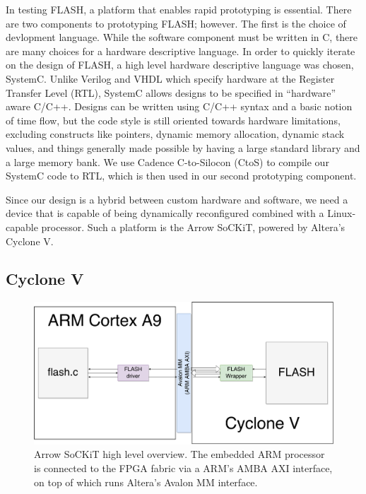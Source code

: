 \documentclass{sig-alternate-10pt}
\begin{document}
In testing FLASH, a platform that enables rapid prototyping is essential.
There are two components to prototyping FLASH; however. The first is the
choice of devlopment language. While the software component must be written
in C, there are many choices for a hardware descriptive language. In order
to quickly iterate on the design of FLASH, a high level hardware descriptive
language was chosen, SystemC. Unlike Verilog and VHDL which specify hardware
at the Register Transfer Level (RTL), SystemC allows designs to
be specified in ``hardware'' aware C/C++. Designs can be written using C/C++
syntax and a basic notion of time flow, but the code style is still oriented
towards hardware limitations, excluding constructs like pointers, dynamic
memory allocation, dynamic stack values, and things generally made possible
by having a large standard library and a large memory bank. We use Cadence
C-to-Silocon (CtoS) to compile our SystemC code to RTL, which is then used
in our second prototyping component.

Since our design is a hybrid between custom hardware and software, we need a device that is capable of being dynamically reconfigured combined with a Linux-capable processor. Such a platform is the Arrow SoCKiT, powered by Altera's Cyclone V.

\subsection{Cyclone V}
\begin{figure}
	\begin{center}
		\includegraphics[width=0.9\linewidth]{fig/sockit-architecture.png}
		\caption{
			Arrow SoCKiT high level overview. The embedded ARM processor is connected to the FPGA fabric via a ARM's AMBA AXI interface, on top of which runs Altera's Avalon MM interface.
		}
		\label{fig:sockit_overview}
	\end{center}
\end{figure}
\end{document}
